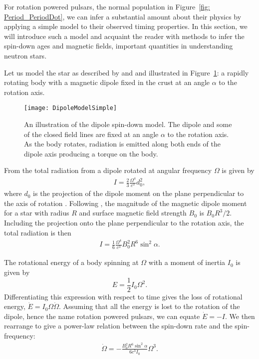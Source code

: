 For rotation powered pulsars, the normal population in Figure~\ref{fig:
Period_PeriodDot}, we can infer a substantial amount about their physics by
applying a simple model to their observed timing properties. In this section,
we will introduce such a model and acquaint the reader with methods to infer
the spin-down ages and magnetic fields, important quantities in understanding
neutron stars.

Let us model the
star as described by \citet{Pacini1967} and \citet{Gold1968} and illustrated in
Figure~\ref{fig: DipoleSpindownSimple}: a rapidly rotating
body with a magnetic dipole fixed in the crust at an angle $\alpha$ to the rotation
axis.
\begin{figure}[htb]
    \centering
    \texttt{[image: DipoleModelSimple]}
    \caption{An illustration of the dipole spin-down model. The dipole and some 
    of the closed field lines are fixed at an angle $\alpha$ to the rotation 
    axis. As the body rotates, radiation is emitted along both ends of the dipole
    axis producing a torque on the body.}
    \label{fig: DipoleSpindownSimple}
\end{figure}

From \citet{Landau2013classical} the total radiation from a dipole rotated at
angular frequency $\Omega$ is given by
\begin{align}
I = \frac{2}{3}\frac{\Omega^{4}}{c^{3}} d_{0}^{2},
\end{align}
where $d_0$ is the projection of the dipole moment on the plane perpendicular
to the axis of rotation \citep{Pacini1967}. Following \citet{Shapiro83}, the
magnitude of the magnetic dipole moment for a star with radius $R$ and surface magnetic
field strength $B_0$ is $B_{0}R^{3}/2$. Including the projection onto the
plane perpendicular to the rotation axis, the total radiation is then
\begin{align}
I = \frac{1}{6}\frac{\Omega^{4}}{c^{3}} B_0^2 R^{6} \sin^{2}\alpha.
\end{align}

The rotational energy of a body spinning at $\Omega$ with a moment of inertia
$I_{0}$ is given by
\begin{equation}
    E = \frac{1}{2}I_{0}\Omega^{2}.
\end{equation}
Differentiating this expression with respect to time gives the loss of rotational
energy, $\dot{E}=I_0 \Omega\dot{\Omega}$. Assuming that all the energy is lost
to the rotation of the dipole, hence the name rotation powered pulsars, we can
equate $\dot{E} = -I$. We then rearrange
to give a power-law relation between the spin-down rate and the spin-frequency:
\begin{align}
\dot{\Omega} = -\frac{B_0^{2} R^{6} \sin^{2}\alpha}{6 c^{3} I_0} \Omega^{3}.
\label{eqn: n3 braking}
\end{align}

